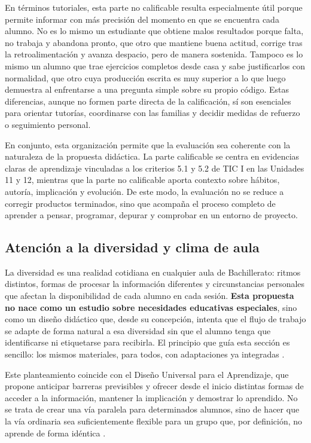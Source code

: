 \documentclass[a4paper,12pt]{article}
\begin{document}
En términos tutoriales, esta parte no calificable resulta especialmente útil porque permite informar con más precisión del momento en que se encuentra cada alumno. No es lo mismo un estudiante que obtiene malos resultados porque falta, no trabaja y abandona pronto, que otro que mantiene buena actitud, corrige tras la retroalimentación y avanza despacio, pero de manera sostenida. Tampoco es lo mismo un alumno que trae ejercicios completos desde casa y sabe justificarlos con normalidad, que otro cuya producción escrita es muy superior a lo que luego demuestra al enfrentarse a una pregunta simple sobre su propio código. Estas diferencias, aunque no formen parte directa de la calificación, sí son esenciales para orientar tutorías, coordinarse con las familias y decidir medidas de refuerzo o seguimiento personal.

En conjunto, esta organización permite que la evaluación sea coherente con la naturaleza de la propuesta didáctica. La parte calificable se centra en evidencias claras de aprendizaje vinculadas a los criterios 5.1 y 5.2 de TIC I en las Unidades 11 y 12, mientras que la parte no calificable aporta contexto sobre hábitos, autoría, implicación y evolución. De este modo, la evaluación no se reduce a corregir productos terminados, sino que acompaña el proceso completo de aprender a pensar, programar, depurar y comprobar en un entorno de proyecto.

\subsection{Atención a la diversidad y clima de aula}


La diversidad es una realidad cotidiana en cualquier aula de Bachillerato: ritmos distintos, formas de procesar la información diferentes y circunstancias personales que afectan la disponibilidad de cada alumno en cada sesión. \textbf{Esta propuesta no nace como un estudio sobre necesidades educativas especiales}, sino como un diseño didáctico que, desde su concepción, intenta que el flujo de trabajo se adapte de forma natural a esa diversidad sin que el alumno tenga que identificarse ni etiquetarse para recibirla. El principio que guía esta sección es sencillo: los mismos materiales, para todos, con adaptaciones ya integradas \citep{capp2017udl}.


Este planteamiento coincide con el Diseño Universal para el Aprendizaje, que propone anticipar barreras previsibles y ofrecer desde el inicio distintas formas de acceder a la información, mantener la implicación y demostrar lo aprendido. No se trata de crear una vía paralela para determinados alumnos, sino de hacer que la vía ordinaria sea suficientemente flexible para un grupo que, por definición, no aprende de forma idéntica \citep{capp2017udl}.
\end{document}
